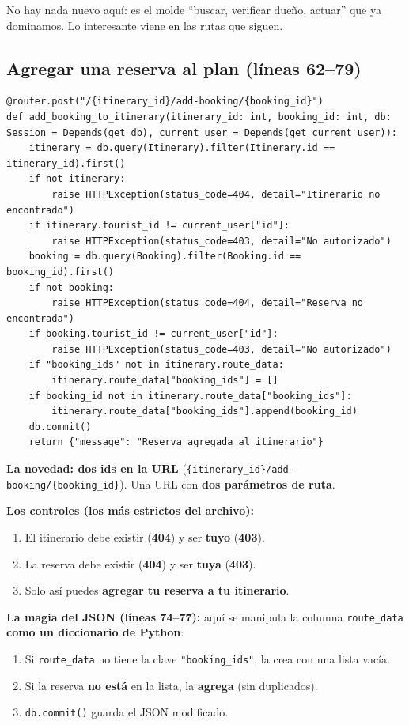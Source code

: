 \documentclass[11pt,a4paper]{article}
\begin{document}
No hay nada nuevo aquí: es el molde ``buscar, verificar dueño, actuar'' que ya dominamos.
Lo interesante viene en las rutas que siguen.

\subsection{Agregar una reserva al plan (líneas 62--79)}

\begin{lstlisting}
@router.post("/{itinerary_id}/add-booking/{booking_id}")
def add_booking_to_itinerary(itinerary_id: int, booking_id: int, db: Session = Depends(get_db), current_user = Depends(get_current_user)):
    itinerary = db.query(Itinerary).filter(Itinerary.id == itinerary_id).first()
    if not itinerary:
        raise HTTPException(status_code=404, detail="Itinerario no encontrado")
    if itinerary.tourist_id != current_user["id"]:
        raise HTTPException(status_code=403, detail="No autorizado")
    booking = db.query(Booking).filter(Booking.id == booking_id).first()
    if not booking:
        raise HTTPException(status_code=404, detail="Reserva no encontrada")
    if booking.tourist_id != current_user["id"]:
        raise HTTPException(status_code=403, detail="No autorizado")
    if "booking_ids" not in itinerary.route_data:
        itinerary.route_data["booking_ids"] = []
    if booking_id not in itinerary.route_data["booking_ids"]:
        itinerary.route_data["booking_ids"].append(booking_id)
    db.commit()
    return {"message": "Reserva agregada al itinerario"}
\end{lstlisting}

\textbf{La novedad: dos ids en la URL} (\texttt{\{itinerary\_id\}/add-booking/\{booking\_id\}}).
Una URL con \textbf{dos parámetros de ruta}.

\textbf{Los controles (los más estrictos del archivo):}
\begin{enumerate}
    \item El itinerario debe existir (\textbf{404}) y ser \textbf{tuyo} (\textbf{403}).
    \item La reserva debe existir (\textbf{404}) y ser \textbf{tuya} (\textbf{403}).
    \item Solo así puedes \textbf{agregar tu reserva a tu itinerario}.
\end{enumerate}

\textbf{La magia del JSON (líneas 74--77):} aquí se manipula la columna
\texttt{route\_data} \textbf{como un diccionario de Python}:
\begin{enumerate}
    \item Si \texttt{route\_data} no tiene la clave \texttt{"booking\_ids"}, la crea con una lista vacía.
    \item Si la reserva \textbf{no está} en la lista, la \textbf{agrega} (sin duplicados).
    \item \texttt{db.commit()} guarda el JSON modificado.
\end{enumerate}
\end{document}
